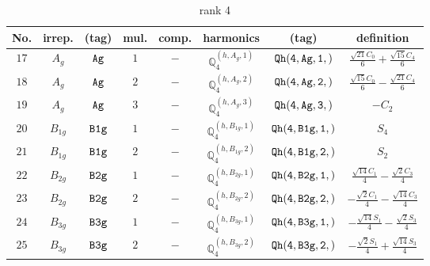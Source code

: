 \documentclass[fleqn,8pt]{jsarticle}
\begin{document}
\begin{table}[ht!]
\begin{center}
\caption{rank 4}
\renewcommand{\arraystretch}{1.3}
\begin{tabular}{cccccccc} \hline \hline
No. & irrep. & (tag) & mul. & comp. & harmonics & (tag) & definition \\ \hline
$ 17 $ & $ A_{g} $ & $ {\tt Ag} $ & $ 1 $ & $ - $ & $ \mathbb{Q}_{4}^{(h,A_{g},1)} $ & $ {\tt Qh(4,Ag,1,)} $ & $ \frac{\sqrt{21} C_{0}}{6} + \frac{\sqrt{15} C_{4}}{6} $ \\
$ 18 $ & $ A_{g} $ & $ {\tt Ag} $ & $ 2 $ & $ - $ & $ \mathbb{Q}_{4}^{(h,A_{g},2)} $ & $ {\tt Qh(4,Ag,2,)} $ & $ \frac{\sqrt{15} C_{0}}{6} - \frac{\sqrt{21} C_{4}}{6} $ \\
$ 19 $ & $ A_{g} $ & $ {\tt Ag} $ & $ 3 $ & $ - $ & $ \mathbb{Q}_{4}^{(h,A_{g},3)} $ & $ {\tt Qh(4,Ag,3,)} $ & $ - C_{2} $ \\
$ 20 $ & $ B_{1g} $ & $ {\tt B1g} $ & $ 1 $ & $ - $ & $ \mathbb{Q}_{4}^{(h,B_{1g},1)} $ & $ {\tt Qh(4,B1g,1,)} $ & $ S_{4} $ \\
$ 21 $ & $ B_{1g} $ & $ {\tt B1g} $ & $ 2 $ & $ - $ & $ \mathbb{Q}_{4}^{(h,B_{1g},2)} $ & $ {\tt Qh(4,B1g,2,)} $ & $ S_{2} $ \\
$ 22 $ & $ B_{2g} $ & $ {\tt B2g} $ & $ 1 $ & $ - $ & $ \mathbb{Q}_{4}^{(h,B_{2g},1)} $ & $ {\tt Qh(4,B2g,1,)} $ & $ \frac{\sqrt{14} C_{1}}{4} - \frac{\sqrt{2} C_{3}}{4} $ \\
$ 23 $ & $ B_{2g} $ & $ {\tt B2g} $ & $ 2 $ & $ - $ & $ \mathbb{Q}_{4}^{(h,B_{2g},2)} $ & $ {\tt Qh(4,B2g,2,)} $ & $ - \frac{\sqrt{2} C_{1}}{4} - \frac{\sqrt{14} C_{3}}{4} $ \\
$ 24 $ & $ B_{3g} $ & $ {\tt B3g} $ & $ 1 $ & $ - $ & $ \mathbb{Q}_{4}^{(h,B_{3g},1)} $ & $ {\tt Qh(4,B3g,1,)} $ & $ - \frac{\sqrt{14} S_{1}}{4} - \frac{\sqrt{2} S_{3}}{4} $ \\
$ 25 $ & $ B_{3g} $ & $ {\tt B3g} $ & $ 2 $ & $ - $ & $ \mathbb{Q}_{4}^{(h,B_{3g},2)} $ & $ {\tt Qh(4,B3g,2,)} $ & $ - \frac{\sqrt{2} S_{1}}{4} + \frac{\sqrt{14} S_{3}}{4} $ \\
 \hline \hline
\end{tabular}
\end{center}
\end{table}
\end{document}
